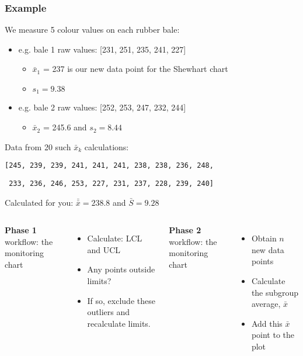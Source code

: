 \begin{frame}\frametitle{Example}

	We measure 5 colour values on each rubber bale:
	\begin{itemize}
		\item	e.g. bale 1 raw values: [231, 251, 235, 241, 227]
		\begin{itemize}
			\item	$\bar{x}_1$ = 237 is our new data point for the Shewhart chart
			\item	$s_1 = 9.38$
		\end{itemize}
		\item	e.g. bale 2 raw values: [252, 253, 247, 232, 244]
		\begin{itemize}
			\item	$\bar{x}_2$ = 245.6 and $s_2 = 8.44$
		\end{itemize}
	\end{itemize}

	Data from 20 such $\bar{x}_k$ calculations:

	\texttt{[245, 239, 239, 241, 241, 241, 238, 238, 236, 248, }

	\texttt{ 233, 236, 246, 253, 227, 231, 237, 228, 239, 240]}

	Calculated for you: $\bar{\bar{x}} = 238.8$ and $\bar{S} = 9.28$
	
	\myhrule
	\begin{columns}[t]
			\textbf{Phase 1} workflow: {} the monitoring chart
			\begin{itemize}
				\item	Calculate: LCL and UCL
				\item	Any points outside limits?
				\item	If so, exclude these outliers and recalculate limits.
			\end{itemize}
			\textbf{Phase 2} workflow: {} the monitoring chart
			\begin{itemize}
				\item	Obtain $n$ new data points
				\item	Calculate the subgroup average, $\bar{x}$
				\item	Add this $\bar{x}$ point to the plot
			\end{itemize}
	\end{columns}

	
\end{frame}

